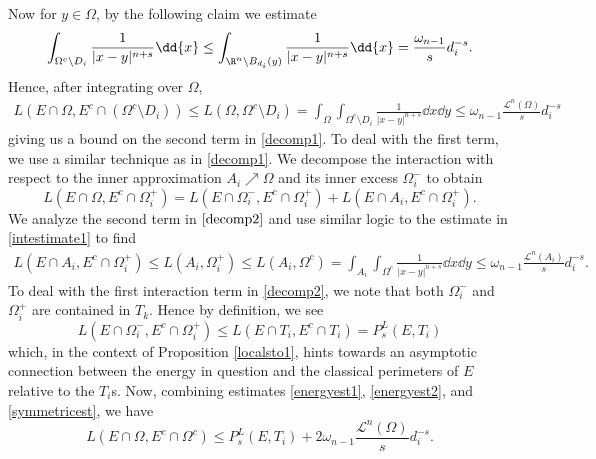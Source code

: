 \documentclass[../main.tex]{subfiles}
\begin{document}
Now for $ y\in \Omega $, by the following claim we estimate
\begin{equation}\label{intestimate1}
    \int_{\Omega^{c}\setminus D_{i}} \frac{1}{|x-y|^{n+s}}\dd{x} \leq \int_{\R^{n}\setminus B_{d_{i}}(y)}\frac{1}{|x-y|^{n+s}}\dd{x} = \frac{\omega_{n-1}}{s} d_{i}^{-s} .
\end{equation}
Hence, after integrating over $ \Omega $,
\begin{align}\label{energyest1}
    L(E\cap \Omega, E^{c}\cap (\Omega^{c}\setminus D_{i})) \leq L(\Omega, \Omega^{c}\setminus D_{i}) = \int_{\Omega}\int_{\Omega^{c}\setminus D_{i}} \frac{1}{|x-y|^{n+s}}\dd{x}\dd{y} \leq \omega_{n-1}\frac{\mathcal{L}^{n}(\Omega)}{s}d_{i}^{-s} 
\end{align}
giving us a bound on the second term in \ref{decomp1}. To deal with the first term, we use a similar technique as in \ref{decomp1}.  We decompose the interaction with respect to the inner approximation $ A_{i}\nearrow \Omega $ and its inner excess $ \Omega_{i}^{-} $ to obtain
\begin{equation}\label{decomp2}
    L(E\cap \Omega, E^{c}\cap \Omega_{i}^{+}) =  L(E\cap \Omega_{i}^{-}, E^{c}\cap \Omega_{i}^{+}) + L(E\cap A_{i}, E^{c}\cap \Omega_{i}^{+}).
\end{equation}
We analyze the second term in $ \ref{decomp2} $ and use similar logic to the estimate in \ref{intestimate1} to find
\begin{align}\label{energyest2}
    L(E\cap A_{i}, E^{c}\cap \Omega_{i}^{+}) \leq L(A_{i}, \Omega_{i}^{+}) \leq L(A_{i}, \Omega^{c}) = \int_{A_{i}}\int_{\Omega^{c}}\frac{1}{|x-y|^{n+s}}\dd{x}\dd{y} \leq \omega_{n-1}\frac{\mathcal{L}^{n}(A_{i})}{s} d_{i}^{-s}.
\end{align}
To deal with the first interaction term in \ref{decomp2}, we note that both $ \Omega_{i}^{-} $ and $ \Omega_{i}^{+} $ are contained in $ T_{k} $. Hence by definition, we see
\begin{equation}\label{symmetricest}
    L(E\cap \Omega_{i}^{-}, E^{c}\cap \Omega_{i}^{+}) \leq L(E\cap T_{i}, E^{c}\cap T_{i}) = P_{s}^{L}(E, T_{i})
\end{equation}
which, in the context of Proposition \ref{localsto1}, hints towards an asymptotic connection between the energy in question and the classical perimeters of $ E $ relative to the $ T_{i} $s. Now, combining estimates \ref{energyest1}, \ref{energyest2}, and \ref{symmetricest}, we have
\[
    L(E\cap \Omega, E^{c}\cap \Omega^{c}) \leq P_{s}^{L}(E,T_{i}) + 2 \omega_{n-1}\frac{\mathcal{L}^{n}(\Omega)}{s}d_{i}^{-s}.
\]
\end{document}
